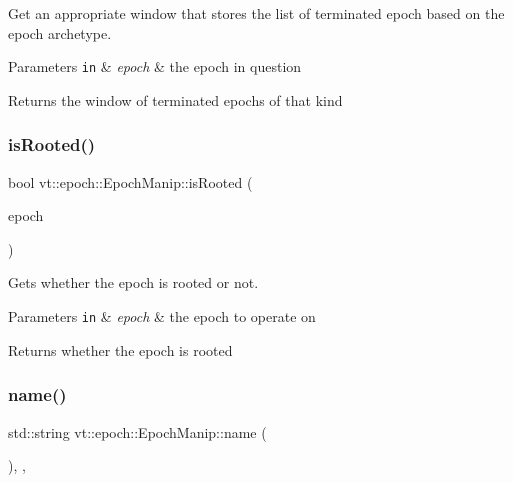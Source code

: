 Get an appropriate window that stores the list of terminated epoch based on the epoch archetype. 


\begin{DoxyParams}[1]{Parameters}
\mbox{\tt in}  & {\em epoch} & the epoch in question\\
\hline
\end{DoxyParams}
\begin{DoxyReturn}{Returns}
the window of terminated epochs of that kind 
\end{DoxyReturn}
\mbox{\label{structvt_1_1epoch_1_1_epoch_manip_a00210a34334fb86984cfbd08bae74929}} 
\subsubsection{\texorpdfstring{is\+Rooted()}{isRooted()}}
{\footnotesize\ttfamily bool vt\+::epoch\+::\+Epoch\+Manip\+::is\+Rooted (\begin{DoxyParamCaption}\item[{\hyperlink{namespacevt_a985a5adf291c34a3ca263b3378388236}{Epoch\+Type} const \&}]{epoch }\end{DoxyParamCaption})\hspace{0.3cm}{\ttfamily [static]}}



Gets whether the epoch is rooted or not. 


\begin{DoxyParams}[1]{Parameters}
\mbox{\tt in}  & {\em epoch} & the epoch to operate on\\
\hline
\end{DoxyParams}
\begin{DoxyReturn}{Returns}
whether the {\ttfamily epoch} is rooted 
\end{DoxyReturn}
\mbox{\label{structvt_1_1epoch_1_1_epoch_manip_a3dcf9b105619194fddde4e26a638b856}} 
\subsubsection{\texorpdfstring{name()}{name()}}
{\footnotesize\ttfamily std\+::string vt\+::epoch\+::\+Epoch\+Manip\+::name (\begin{DoxyParamCaption}{ }\end{DoxyParamCaption})\hspace{0.3cm}{\ttfamily [inline]}, {\ttfamily [override]}, {\ttfamily [virtual]}}



